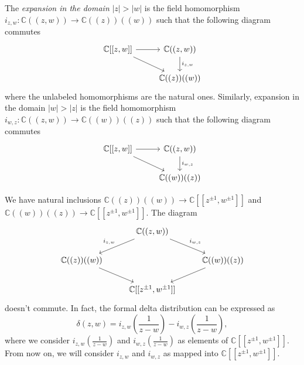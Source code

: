 \documentclass[a4paper, 12pt, reqno]{amsart}
\theoremstyle{remark}
\numberwithin{equation}{subsection}
\begin{document}
The \emph{expansion in the domain} $|z| > |w|$ is the field homomorphism $i_{z, w}: \mathbb{C}((z, w)) \to \mathbb{C}((z))((w))$ such that the following diagram commutes
\begin{equation*}
  \begin{tikzcd}
    {\mathbb{C}[[z, w]]} \arrow[rd] \arrow[r] & {\mathbb{C}((z, w))} \arrow[d, "{i_{z,w}}"] \\
    & \mathbb{C}((z))((w))                                          
  \end{tikzcd}
\end{equation*}
where the unlabeled homomorphisms are the natural ones.
Similarly, expansion in the domain $|w| > |z|$ is the field homomorphism $i_{w, z}: \mathbb{C}((z, w)) \to \mathbb{C}((w))((z))$ such that the following diagram commutes
\begin{equation*}
  \begin{tikzcd}
    {\mathbb{C}[[z, w]]} \arrow[rd] \arrow[r] & {\mathbb{C}((z, w))}\arrow[d, "{i_{w, z}}"] \\
    & \mathbb{C}((w))((z))                                          
  \end{tikzcd}
\end{equation*}

We have natural inclusions $\mathbb{C}((z))((w)) \to \mathbb{C}[[z^{\pm 1}, w^{\pm 1}]]$ and $\mathbb{C}((w))((z)) \to \mathbb{C}[[z^{\pm 1}, w^{\pm 1}]]$.
The diagram
\begin{equation*}
  \begin{tikzcd}
    & {\mathbb{C}((z, w))} \arrow[ld, "{i_{z,w}}"'] \arrow[rd, "{i_{w,z}}"] &                                 \\
    \mathbb{C}((z))((w)) \arrow[rd] &                                                                      & \mathbb{C}((w))((z)) \arrow[ld] \\
    & {\mathbb{C}[[z^{\pm 1}, w^{\pm 1}]]}                                  &                                
  \end{tikzcd}
\end{equation*}
doesn't commute. In fact, the formal delta distribution can be expressed as
\begin{equation*} 
  \delta(z, w) = i_{z, w}\left(\frac{1}{z - w}\right) - i_{w, z}\left(\frac{1}{z - w}\right),
\end{equation*}
where we consider $i_{z, w}(\frac{1}{z - w})$ and $i_{w, z}(\frac{1}{z - w})$ as elements of $\mathbb{C}[[z^{\pm 1}, w^{\pm 1}]]$.
From now on, we will consider $i_{z, w}$ and $i_{w, z}$ as mapped into $\mathbb{C}[[z^{\pm 1}, w^{\pm 1}]]$.
\end{document}
